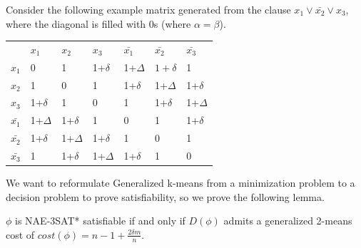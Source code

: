Consider the following example matrix generated from the clause $x_1 \vee \bar{x_2} \vee x_3$, where the diagonal is filled with 0s (where $\alpha=\beta$).

\begin{table}[H]
\begin{tabular}{lllllll}
                       & $x_1$                      & $x_2 $                     & $x_3 $                    & $\bar{x_1}$                      & $\bar{x_2}$                      & $\bar{x_3}$                     \\ \cline{2-7} 
\multicolumn{1}{l|}{$x_1$} & \multicolumn{1}{l|}{0} & \multicolumn{1}{l|}{1}  & \multicolumn{1}{l|}{1+$\delta$}  & \multicolumn{1}{l|}{1+$\Delta$}  & \multicolumn{1}{l|}{$1+\delta$}  & \multicolumn{1}{l|}{1}  \\ \cline{2-7} 
\multicolumn{1}{l|}{$x_2$} & \multicolumn{1}{l|}{1}  & \multicolumn{1}{l|}{0} & \multicolumn{1}{l|}{1}  & \multicolumn{1}{l|}{1+$\delta$}  & \multicolumn{1}{l|}{1+$\Delta$}  & \multicolumn{1}{l|}{1+$\delta$}  \\ \cline{2-7} 
\multicolumn{1}{l|}{$x_3$} & \multicolumn{1}{l|}{1+$\delta$}  & \multicolumn{1}{l|}{1}  & \multicolumn{1}{l|}{0} & \multicolumn{1}{l|}{1}  & \multicolumn{1}{l|}{1+$\delta$}  & \multicolumn{1}{l|}{1+$\Delta$}  \\ \cline{2-7} 
\multicolumn{1}{l|}{$\bar{x_1}$} & \multicolumn{1}{l|}{1+$\Delta$}  & \multicolumn{1}{l|}{1+$\delta$}  & \multicolumn{1}{l|}{1}  & \multicolumn{1}{l|}{0} & \multicolumn{1}{l|}{1}  & \multicolumn{1}{l|}{1+$\delta$}  \\ \cline{2-7} 
\multicolumn{1}{l|}{$\bar{x_2}$} & \multicolumn{1}{l|}{1+$\delta$}  & \multicolumn{1}{l|}{1+$\Delta$}  & \multicolumn{1}{l|}{1+$\delta$}  & \multicolumn{1}{l|}{1}  & \multicolumn{1}{l|}{0} & \multicolumn{1}{l|}{1}  \\ \cline{2-7} 
\multicolumn{1}{l|}{$\bar{x_3}$} & \multicolumn{1}{l|}{1}  & \multicolumn{1}{l|}{1+$\delta$}  & \multicolumn{1}{l|}{1+$\Delta$}  & \multicolumn{1}{l|}{1+$\delta$}  & \multicolumn{1}{l|}{1}  & \multicolumn{1}{l|}{0} \\ \cline{2-7} 

\end{tabular}

\end {table}

We want to reformulate Generalized k-means from a minimization problem to a decision problem to prove satisfiability, so we prove the following lemma.
\begin{lemma} \label{generalized-2-means-cost}
$\phi$ is NAE-3SAT* satisfiable if and only if $D(\phi)$ admits a
generalized 2-means cost of $cost(\phi) = n - 1 + \frac{2\delta
  m}{n}$. 
\end{lemma}

